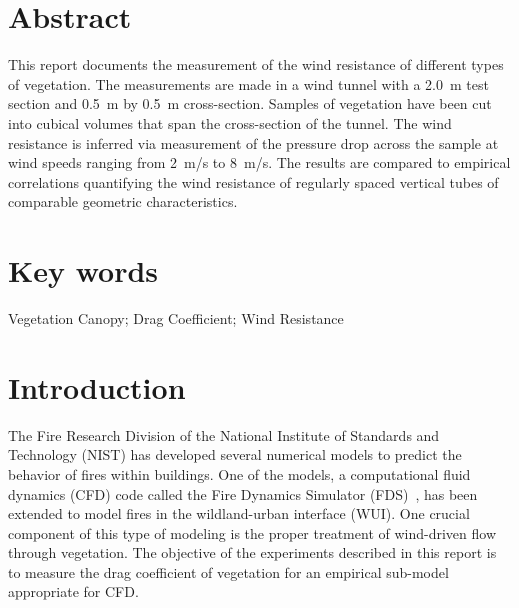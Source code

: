 \documentclass[12pt]{article}
\begin{document}
\pagestyle{plain}

\section*{Abstract}

This report documents the measurement of the wind resistance of different types of vegetation. The measurements are made in a wind tunnel with a 2.0~\si{m} test section and 0.5~\si{m} by 0.5~\si{m} cross-section. Samples of vegetation have been cut into cubical volumes that span the cross-section of the tunnel. The wind resistance is inferred via measurement of the pressure drop across the sample at wind speeds ranging from 2~\si{m/s} to 8~\si{m/s}. The results are compared to empirical correlations quantifying the wind resistance of regularly spaced vertical tubes of comparable geometric characteristics.

\section*{Key words}

Vegetation Canopy; Drag Coefficient; Wind Resistance

\cleardoublepage

\begin{center}
	\tableofcontents
	\listoftables
	\listoffigures
\end{center}

\cleardoublepage

\pagestyle{plain}


\section{Introduction}
\label{sec:intro}

The Fire Research Division of the National Institute of Standards and Technology (NIST) has developed several numerical models to predict the behavior of fires within buildings. One of the models, a computational fluid dynamics (CFD) code called the Fire Dynamics Simulator (FDS)~\cite{FDS_Tech_Guide}, has been extended to model fires in the wildland-urban interface (WUI). One crucial component of this type of modeling is the proper treatment of wind-driven flow through vegetation. The objective of the experiments described in this report is to measure the drag coefficient of vegetation for an empirical sub-model appropriate for CFD.
\end{document}

